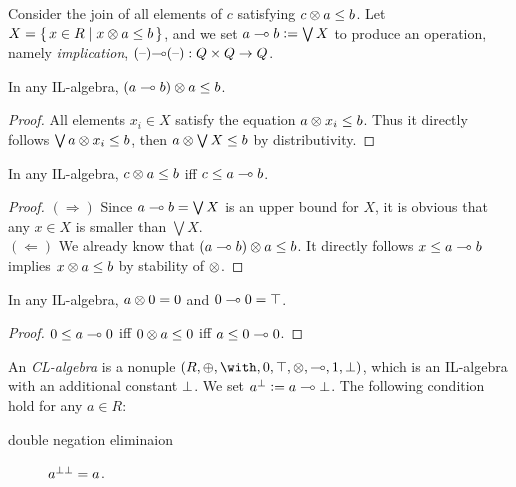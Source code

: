 \begin{definition} [implication]
Consider the join of all elements of $c$ satisfying $c \otimes a \leq b$.
Let $X = \set{ x \in R | x \otimes a \leq b}$,
and we set $ a \multimap b \mathrel{\mathop:}= \bigvee X$ to produce an operation, namely {\em implication}, 
$ {{(\mbox{\textendash})}} { \multimap } {{(\mbox{\textendash})}} : Q \times Q \rightarrow Q$.
\end{definition}
\begin{proposition}
In any IL-algebra,
$ (a \multimap b)  \otimes a  \leq b$.
\end{proposition}
\begin{proof}
All elements $x_i \in X$ 
satisfy the equation $ a \otimes x_i  \leq b$.
Thus it directly follows $\bigvee a \otimes x_i \leq b$, then
$a \otimes \bigvee X \leq b$ by distributivity. 
\end{proof}
\begin{proposition}   In any IL-algebra,
$c \otimes a \leq b$ iff $ c \leq a \multimap b$.
\end{proposition}
\begin{proof}
$(\Rightarrow)$  
Since $a \multimap b = \bigvee X$ is an upper bound for $X$, 
it is obvious that any $x \in X$ is smaller than $\bigvee X$. \\
$(\Leftarrow)$  
We already know that  $ (a \multimap b) \otimes a  \leq b$.
It directly follows $x \leq a \multimap b$ implies $x \otimes a \leq b$ 
by stability of $\otimes$. 
\end{proof}
\begin{proposition} In any IL-algebra, 
$a \otimes \mbox{\boldmath{0}} = \mbox{\boldmath{0}}$ and $  \mbox{\boldmath{0}} \multimap \mbox{\boldmath{0}} = \top$. 
\end{proposition}
\begin{proof}
$ \mbox{\boldmath{0}} \leq a \multimap \mbox{\boldmath{0}}$ iff $\mbox{\boldmath{0}} \otimes a \leq \mbox{\boldmath{0}}$
iff $a \leq \mbox{\boldmath{0}} \multimap \mbox{\boldmath{0}}$. 
\end{proof}
\begin{definition}[CL-algebra]
An  {\it CL-algebra} is a nonuple 
$(R,\LLoplus,\with,\LLzero,\LLtop,\LLotimes,\LLimp,\LLone,\LLbot)$, 
which is an IL-algebra with an additional constant $\bot$. 
We set ${{a}^{\bot}} \mathrel{\mathop:}= a \multimap \bot$. 
The following condition hold for any $a \in R$:
\begin{description} 
\item [double negation eliminaion] $ {{a}^{\bot\bot}} = a$.
\end{description}
\end{definition}
